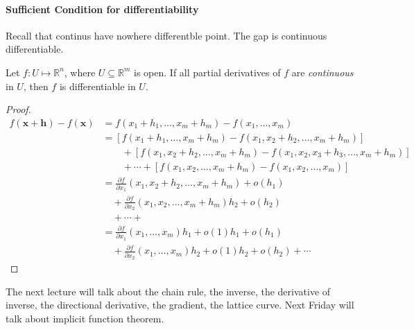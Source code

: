 \paragraph{Sufficient Condition for differentiability}
Recall that continus have nowhere differentble point. The gap is continuous differentiable.
\begin{theorem}
Let $f:U\mapsto\mathbb{R}^n$, where $U\subseteq\mathbb{R}^m$ is open. If all partial derivatives of $f$ are \emph{continuous} in $U$, then $f$ is differentiable in $U$.
\end{theorem}
\begin{proof}
\begin{align*}
f(\bm x+\bm h) - f(\bm x) &=f(x_1+h_1,\dots,x_m+h_m) - f(x_1,\dots,x_m) \\
&=[f(x_1+h_1,\dots,x_m+h_m) - f(x_1,x_2+h_2,\dots,x_m+h_m)]\\
&\qquad +[f(x_1,x_2+h_2,\dots,x_m+h_m)-f(x_1,x_2,x_3+h_3,\dots,x_m+h_m)]\\
&\qquad+\cdots+
[f(x_1,x_2,\dots,x_m+h_m) - f(x_1,x_2,\dots,x_m)]\\
&=\frac{\partial f}{\partial x_1}(x_1,x_2+h_2,\dots,x_m+h_m)+o(h_1)\\
&\quad +\frac{\partial f}{\partial x_2}(x_1,x_2,\dots,x_m+h_m)h_2+o(h_2)\\
&\quad+\cdots+\\
&=\frac{\partial f}{\partial x_1}(x_1,\dots,x_m)h_1 +o(1)h_1+o(h_1)\\
&\quad +\frac{\partial f}{\partial x_2}(x_1,\dots,x_m)h_2 +o(1)h_2+o(h_2)+\cdots
\end{align*}



\end{proof}


The next lecture will talk about the chain rule, the inverse, the derivative of inverse, the directional derivative, the gradient, the lattice curve. Next Friday will talk about implicit function theorem. 







